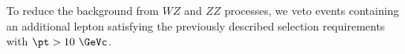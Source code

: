 To reduce the background from $WZ$ and $ZZ$ processes, we veto events
containing an additional lepton satisfying the previously described selection requirements
with $\pt > 10~\GeVc$.

